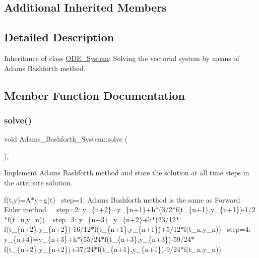\subsection*{Additional Inherited Members}


\subsection{Detailed Description}
Inheritance of class \mbox{\hyperlink{class_o_d_e___system}{O\+D\+E\+\_\+\+System}}\+: Solving the vectorial system by means of Adams Bashforth method. 

\subsection{Member Function Documentation}
\mbox{\label{class_adams___bashforth___system_aa34bb9a1367a3b15f606ff49054e9ece}} 
\subsubsection{\texorpdfstring{solve()}{solve()}}
{\footnotesize\ttfamily void Adams\+\_\+\+Bashforth\+\_\+\+System\+::solve (\begin{DoxyParamCaption}{ }\end{DoxyParamCaption})\hspace{0.3cm}{\ttfamily [override]}, {\ttfamily [virtual]}}



Implement Adams Bashforth method and store the solution at all time steps in the attribute solution. 

f(t,y)=A$\ast$y+g(t)~\newline
step=1\+: Adams Bashforth method is the same as Forward Euler method. ~\newline
step=2\+: y\+\_\+\{n+2\}=y\+\_\+\{n+1\}+h$\ast$(3/2$\ast$f(t\+\_\+\{n+1\},y\+\_\+\{n+1\})-\/1/2$\ast$f(t\+\_\+n,y\+\_\+n)) ~\newline
step=3\+: y\+\_\+\{n+3\}=y\+\_\+\{n+2\}+h$\ast$(23/12$\ast$f(t\+\_\+\{n+2\},y\+\_\+\{n+2\})-\/16/12$\ast$f(t\+\_\+\{n+1\},y\+\_\+\{n+1\})+5/12$\ast$f(t\+\_\+n,y\+\_\+n))~\newline
step=4\+: y\+\_\+\{n+4\}=y\+\_\+\{n+3\}+h$\ast$(55/24$\ast$f(t\+\_\+\{n+3\},y\+\_\+\{n+3\})-\/59/24$\ast$f(t\+\_\+\{n+2\},y\+\_\+\{n+2\})+37/24$\ast$f(t\+\_\+\{n+1\},y\+\_\+\{n+1\})-\/9/24$\ast$f(t\+\_\+n,y\+\_\+n)) ~\newline

